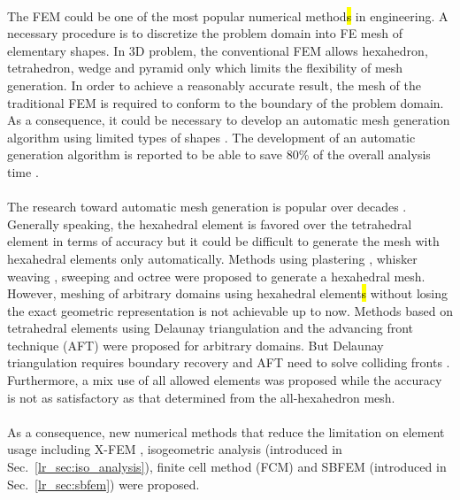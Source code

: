 \paragraph{}
The FEM could be one of the most popular numerical method\hl{s} in engineering.
A necessary procedure is to discretize the problem domain into FE mesh of elementary shapes.
In 3D problem, the conventional FEM allows hexahedron, tetrahedron, wedge and pyramid only which limits the flexibility of mesh generation.
In order to achieve a reasonably accurate result, the mesh of the traditional FEM is required to conform to the boundary of the problem domain.
As a consequence, it could be necessary to develop an automatic mesh generation algorithm using limited types of shapes \citep{Frey:2007:MGA:1205626}.
The development of an automatic generation algorithm is reported to be able to save 80\% of the overall analysis time \citep{Hug2005}.

\paragraph{}
The research toward automatic mesh generation is popular over decades \citep{owen2000,Blacker1993,doi:10.1002/fld.1650081003,doi:10.1093/comjnl/24.2.167}.
Generally speaking, the hexahedral element is favored over the tetrahedral element in terms of accuracy but it could be difficult to generate the mesh with hexahedral elements only automatically.
Methods using plastering \citep{Blacker1993}, whisker weaving \citep{Tau1984}, sweeping \citep{Staten1999} and octree \citep{doi:10.1002/nme.1620201103} were proposed to generate a hexahedral mesh.
However, meshing of arbitrary domains using hexahedral element\hl{s} without losing the exact geometric representation is not achievable up to now.
Methods based on tetrahedral elements using Delaunay triangulation \citep{doi:10.1093/comjnl/24.2.167} and the advancing front technique (AFT) \citep{doi:10.1002/fld.1650081003} were proposed for arbitrary domains.
But Delaunay triangulation requires boundary recovery \citep{doi:10.1002/nme.808,LIU201432} and AFT need to solve colliding fronts \citep{Shewchuk1997}.
Furthermore, a mix use of all allowed elements \citep{owen2000} was proposed while the accuracy is not as satisfactory as that determined from the all-hexahedron mesh.

\paragraph{}
As a consequence, new numerical methods that reduce the limitation on element usage including X-FEM \citep{Moes1999}, isogeometric analysis \citep{Hug2005} (introduced in Sec.~\ref{lr_sec:iso_analysis}), finite cell method (FCM) \citep{Parvizian2007} and SBFEM \citep{Wol2003} (introduced in Sec.~\ref{lr_sec:sbfem}) were proposed.

